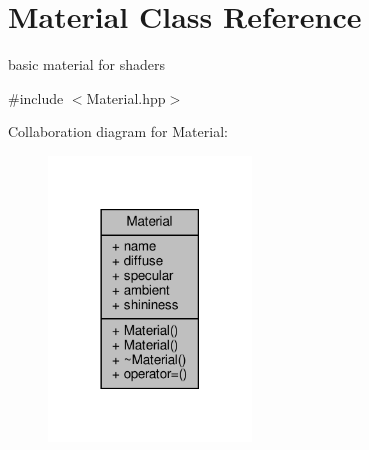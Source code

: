 \hypertarget{class_material}{}\section{Material Class Reference}
\label{class_material}


basic material for shaders  




{\ttfamily \#include $<$Material.\+hpp$>$}



Collaboration diagram for Material\+:
\nopagebreak
\begin{figure}[H]
\begin{center}
\leavevmode
\includegraphics[width=153pt]{class_material__coll__graph}
\end{center}
\end{figure}
